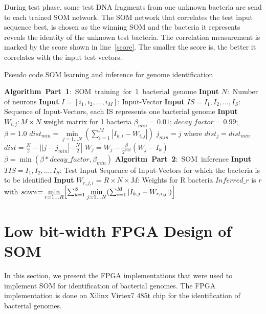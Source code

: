 During test phase, some test DNA fragments from one unknown bacteria are send to each trained SOM network. The SOM network that correlates the test input sequence best, is chosen as the winning SOM and the bacteria it represents reveals the identity of the unknown test bacteria. The correlation measurement is marked by the score shown in line~\ref{score}. The smaller the score is, the better it correlates with the input test vectors.
\begin{algorithm}[htb]
	 \caption{Pseudo code SOM learning and inference for genome identification}
	\label{alg:algorithm}
	\begin{algorithmic}[1]\label{Algo:SOMTraining}
		\Statex \mbox{\textbf{Algorithm Part 1}: SOM training for 1 bacterial genome}
		\Statex \textbf{Input} $N:$ Number of neurons
		\Statex \textbf{Input} $I{=}[i_1, i_2, ..., i_M]$: Input-Vector
       	\Statex \textbf{Input} $IS{=}{I_1, I_2, ..., I_S}$: Sequence of Input-Vectors, each IS represents one bacterial genome\label{IS_Def}
       	\Statex \textbf{Input} $W_{i,j}: M\times N$ weight matrix for 1 bacteria
        \State $\beta_{min}=0.01$; $decay\_factor=0.99$; $\beta=1.0$\label{beta_init}
		\State $dist_{min}=\min\limits_{j=1...N}(\sum_{i=1}^{M}|I_{k,i}-W_{i,j}|)$\label{dist_min}
        \State $j_{min} = j$ where $dist_{j} = dist_{min}$\label{j_min}
           \State $dist = \frac{N}{2} - ||j-j_{min}|-\frac{N}{2}|$\label{dist_update} 
           \State $W_j = W_j - \frac{\beta}{2^{dist}}(W_j-I_k)$\label{W_update}
        \EndFor
        \State $\beta = \min(\beta*decay\_factor, \beta_{min})$\label{beta_update}
		\EndFor
  \Statex
   \mbox{\textbf{Algoritm Part 2}: SOM inference}
    \Statex \textbf{Input} $TIS{=}{I_1, I_2, ..., I_S}$: Test Input Sequence of Input-Vectors for which the bacteria is to be identified
    \Statex \textbf{Input} $W_{r,j,i}{=}R\times N \times M$: Weights for R bacteria
    \State $Inferred\_r$ is $r$ with\label{inferred_r}
    \State $score{=}\min\limits_{r=1...R}\Bigl[\sum_{k=1}^{S}\min\limits_{j=1...N}(\sum_{i=1}^{M} |I_{k,j}-W_{r,i,j}|)\Bigr]$\label{score}
	\end{algorithmic}
\end{algorithm}
\section{Low bit-width FPGA Design of SOM}\label{custom}
In this section, we present the FPGA implementations that were used to implement SOM for identification of bacterial genomes. The FPGA implementation is done on Xilinx Virtex7 485t chip for the identification of bacterial genomes. 

